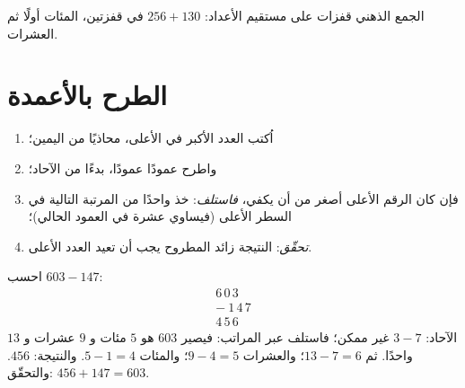 \begin{omfigure}

{\small الجمع الذهني قفزات على مستقيم الأعداد: $256 + 130$ في
قفزتين، المئات أولًا ثم العشرات.}
\end{omfigure}

\section{الطرح بالأعمدة}

\begin{method}\label{met:g3:addsub:sub}
\begin{enumerate}
  \item اُكتب العدد الأكبر في الأعلى، محاذيًا من اليمين؛
  \item واطرح عمودًا عمودًا، بدءًا من الآحاد؛
  \item فإن كان الرقم الأعلى أصغر من أن يكفي، \emph{فاستلف}: خذ
        واحدًا من المرتبة التالية في السطر الأعلى (فيساوي عشرة في
        العمود الحالي)؛
  \item \emph{تحقّق}: النتيجة زائد المطروح يجب أن تعيد
        العدد الأعلى.
\end{enumerate}
\end{method}

\begin{example}\label{ex:g3:addsub:sub}
احسب $603 - 147$:
\[
\begin{array}{r}
6\,0\,3 \\
-\ 1\,4\,7 \\
\hline
4\,5\,6
\end{array}
\]
الآحاد: $3 - 7$ غير ممكن؛ فاستلف عبر المراتب: فيصير $603$
هو $5$ مئات و $9$ عشرات و $13$ واحدًا. ثم $13 - 7 = 6$؛
والعشرات $9 - 4 = 5$؛ والمئات $5 - 1 = 4$. والنتيجة: $456$.
والتحقّق: $456 + 147 = 603$.
\end{example}

